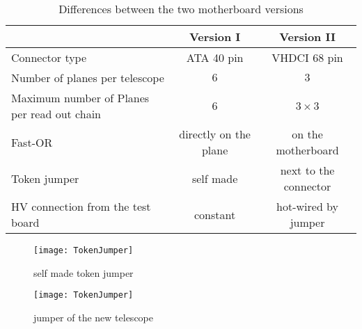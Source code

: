 \begin{table}[ht]
	\centering
	\begin{tabular}{p{4cm}|c|c}
										& Version I 			& Version II 					\\\hline\hline
		Connector type 					& ATA 40 pin 			& VHDCI 68 pin					\\\hline			
		Number of planes per telescope 	& $6$ 					& $3$							\\\hline
		Maximum number of Planes per read out chain		& $6$					& $3\times3$ \footnotemark[1] \\\hline
		Fast-OR							& directly on the plane	& on the motherboard			\\\hline
		Token jumper					& self made				& next to the connector	\\\hline
		HV connection from the test board	&  constant			& hot-wired by jumper
	\end{tabular}					
	\caption{Differences between the two motherboard versions}
	\label{t1}
\end{table}\no
{}
\begin{figure}[ht]
	\begin{minipage}{6cm}
		\texttt{[image: TokenJumper]}
		\caption{self made token jumper}
		\label{p2}
	\end{minipage}
	\hfill
	\begin{minipage}{6cm}
		\texttt{[image: TokenJumper]}
		\caption{jumper of the new telescope}
		\label{p3}
	\end{minipage}
\end{figure}
\newpage
